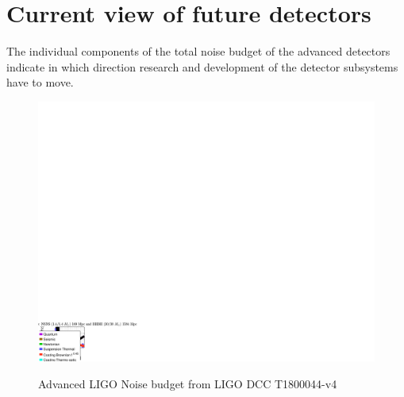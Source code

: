\section{Current view of future detectors}
                 
The individual components of the total noise budget of the advanced detectors indicate in which direction research and development of the detector subsystems have to move.

\begin{figure}[h]
\includegraphics[width=\textwidth]{Figures/aLIGO_newDesign.pdf}
\label{fig:ALIGOSensitivity}
\caption[Advanced LIGO Noise budget]{Advanced LIGO Noise budget from LIGO DCC T1800044-v4 }
\end{figure}



